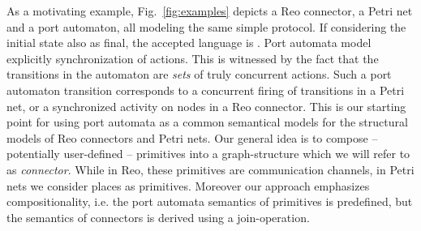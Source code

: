 \documentclass[copyright,creativecommons]{eptcs}
\begin{document}
As a motivating example, Fig.~\ref{fig:examples} depicts a Reo connector,
a Petri net and a port automaton, all modeling the same simple protocol.
If considering the initial state also as final, the accepted language
is . Port automata model explicitly synchronization of actions.
This is witnessed by the fact that the transitions in the automaton are 
\emph{sets} of truly concurrent actions. Such a port automaton transition
corresponds to a concurrent firing of transitions in a Petri net, or a synchronized activity
on nodes in a Reo connector. This is our starting point for
using port automata as a common semantical models for the structural
models of Reo connectors and Petri nets. Our general idea is to compose 
-- potentially user-defined -- primitives into a graph-structure which we will
refer to as \emph{connector}. While in Reo, these primitives are communication channels,
in Petri nets we consider places as primitives.
Moreover our approach emphasizes compositionality, i.e.
the port automata semantics of primitives is predefined, but the semantics 
of connectors is derived using a join-operation.
\end{document}
